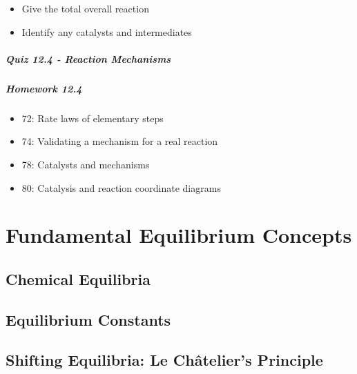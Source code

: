 \documentclass[12pt, openany, letterpaper]{memoir}
\begin{document}
\begin{itemize}
	
	
	\begin{itemize}
		\item Give the total overall reaction
		\item Identify any catalysts and intermediates
	\end{itemize}
\end{itemize}

\paragraph*{Quiz 12.4 - Reaction Mechanisms}
\paragraph*{Homework 12.4}
\begin{itemize}
  \item 72: Rate laws of elementary steps
  \item 74: Validating a mechanism for a real reaction
  \item 78: Catalysts and mechanisms
  \item 80: Catalysis and reaction coordinate diagrams
\end{itemize}

\chapter{Fundamental Equilibrium Concepts}

\section{Chemical Equilibria}

\section{Equilibrium Constants}

\section{Shifting Equilibria: Le Ch\^atelier's Principle}
\end{document}
